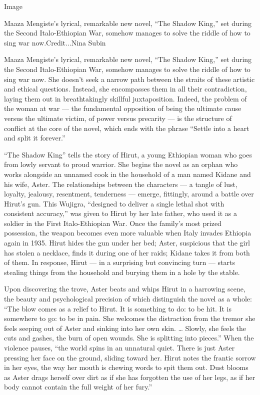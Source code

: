 Image

Maaza Mengiste's lyrical, remarkable new novel, ``The Shadow King,'' set
during the Second Italo-Ethiopian War, somehow manages to solve the
riddle of how to sing war now.Credit...Nina Subin

Maaza Mengiste's lyrical, remarkable new novel, ``The Shadow King,'' set
during the Second Italo-Ethiopian War, somehow manages to solve the
riddle of how to sing war now. She doesn't seek a narrow path between
the straits of these artistic and ethical questions. Instead, she
encompasses them in all their contradiction, laying them out in
breathtakingly skillful juxtaposition. Indeed, the problem of the woman
at war --- the fundamental opposition of being the ultimate cause versus
the ultimate victim, of power versus precarity --- is the structure of
conflict at the core of the novel, which ends with the phrase ``Settle
into a heart and split it forever.''

``The Shadow King'' tells the story of Hirut, a young Ethiopian woman
who goes from lowly servant to proud warrior. She begins the novel as an
orphan who works alongside an unnamed cook in the household of a man
named Kidane and his wife, Aster. The relationships between the
characters --- a tangle of lust, loyalty, jealousy, resentment,
tenderness --- emerge, fittingly, around a battle over Hirut's gun. This
Wujigra, ``designed to deliver a single lethal shot with consistent
accuracy,'' was given to Hirut by her late father, who used it as a
soldier in the First Italo-Ethiopian War. Once the family's most prized
possession, the weapon becomes even more valuable when Italy invades
Ethiopia again in 1935. Hirut hides the gun under her bed; Aster,
suspicious that the girl has stolen a necklace, finds it during one of
her raids; Kidane takes it from both of them. In response, Hirut --- in
a surprising but convincing turn --- starts stealing things from the
household and burying them in a hole by the stable.

Upon discovering the trove, Aster beats and whips Hirut in a harrowing
scene, the beauty and psychological precision of which distinguish the
novel as a whole: ``The blow comes as a relief to Hirut. It is something
to do: to be hit. It is somewhere to go: to be in pain. She welcomes the
distraction from the tremor she feels seeping out of Aster and sinking
into her own skin. \ldots{} Slowly, she feels the cuts and gashes, the
burn of open wounds. She is splitting into pieces.'' When the violence
pauses, ``the world spins in an unnatural quiet. There is just Aster
pressing her face on the ground, sliding toward her. Hirut notes the
frantic sorrow in her eyes, the way her mouth is chewing words to spit
them out. Dust blooms as Aster drags herself over dirt as if she has
forgotten the use of her legs, as if her body cannot contain the full
weight of her fury.''

